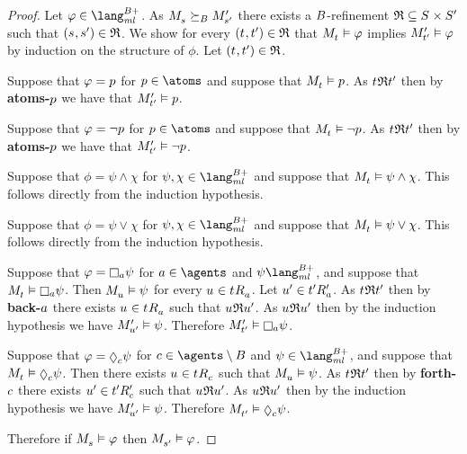 \begin{proof}
Let $\phi \in \langMlPlusBs$.
As $\kPModel{\kStateS} \simulatesBs \kPModelP{\kStateSP}$ there exists a $B$-refinement $\refinement \subseteq \kStates \times \kStatesP$ such that $(\kStateS, \kStateSP) \in \refinement$.
We show for every $(\kStateT, \kStateTP) \in \refinement$ that $\kPModel{\kStateT} \entails \phi$ implies ${M^{\prime}_{{{t}^{\prime}}}} \vDash \varphi$ by induction on the structure of $\phi$.
Let $(\kStateT, \kStateTP) \in \refinement$.

Suppose that $\varphi = p$ for $\atomP \in \atoms$ and suppose that $\kPModel{\kStateT} \entails \atomP$.
As $\kStateT \refinement \kStateTP$ then by {\bf atoms-$p$} we have that ${M^{\prime}_{{{t}^{\prime}}}} \vDash p$.

Suppose that $\varphi = \lnot p$ for $\atomP \in \atoms$ and suppose that $\kPModel{\kStateT} \entails \lnot \atomP$.
As $\kStateT \refinement \kStateTP$ then by {\bf atoms-$p$} we have that ${M^{\prime}_{{{t}^{\prime}}}} \vDash \lnot p$.

Suppose that $\phi = \psi \land \chi$ for $\psi, \chi \in \langMlPlusBs$ and suppose that $\kPModel{\kStateT} \entails \psi \land \chi$.
This follows directly from the induction hypothesis.

Suppose that $\phi = \psi \lor \chi$ for $\psi, \chi \in \langMlPlusBs$ and suppose that $\kPModel{\kStateT} \entails \psi \lor \chi$.
This follows directly from the induction hypothesis.

Suppose that $\phi = \necessaryA \psi$ for $\agentA \in \agents$ and $\psi \langMlPlusBs$, and suppose that $\kPModel{\kStateT} \entails \necessaryA \psi$.
Then $\kPModel{\kStateU} \entails \psi$ for every $\kStateU \in \kSuccessorsA{\kStateT}$.
Let ${{u}^{\prime}} \in {{{t}^{\prime}}} {R^{\prime}_{a}}$.
As $\kStateT \refinement \kStateTP$ then by {\bf back-$a$} there exists $\kStateU \in \kSuccessorsA{\kStateT}$ such that $\kStateU \refinement \kStateUP$.
As $\kStateU \refinement \kStateUP$ then by the induction hypothesis we have ${M^{\prime}_{{{u}^{\prime}}}} \vDash \psi$.
Therefore $\kPModelP{\kStateTP} \entails \necessaryA \psi$.

Suppose that $\phi = \possibleC \psi$ for $\agentC \in \agents \setminus \agentsB$ and $\psi \in \langMlPlusBs$, and suppose that $\kPModel{\kStateT} \entails \possibleC \psi$.
Then there exists $\kStateU \in \kSuccessorsC{\kStateT}$ such that $\kPModel{\kStateU} \entails \psi$.
As $\kStateT \refinement \kStateTP$ then by {\bf forth-$c$} there exists ${{u}^{\prime}} \in {{{t}^{\prime}}} {R^{\prime}_{c}}$ such that $\kStateU \refinement \kStateUP$.
As $\kStateU \refinement \kStateUP$ then by the induction hypothesis we have ${M^{\prime}_{{{u}^{\prime}}}} \vDash \psi$.
Therefore $\kPModel{\kStateTP} \entails \possibleC \psi$.

Therefore if $\kPModel{\kStateS} \entails \phi$ then $\kPModel{\kStateSP} \entails \phi$.
\end{proof}

